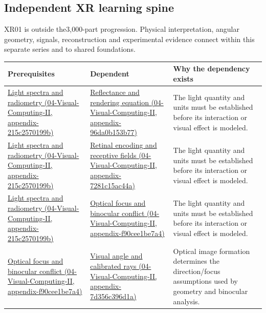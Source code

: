 \subsection{Independent XR learning spine}\label{independent-xr-learning-spine}

XR01 is outside the3,000-part progression. Physical interpretation, angular geometry, signals, reconstruction and experimental evidence connect within this separate series and to shared foundations.

{\def\LTcaptype{none} %
\begin{longtable}[]{@{}
  >{\raggedright\arraybackslash}p{}
  >{\raggedright\arraybackslash}p{}
  >{\raggedright\arraybackslash}p{}@{}}
\toprule\noalign{}
\begin{minipage}[b]{\linewidth}\raggedright
Prerequisites
\end{minipage} & \begin{minipage}[b]{\linewidth}\raggedright
Dependent
\end{minipage} & \begin{minipage}[b]{\linewidth}\raggedright
Why the dependency exists
\end{minipage} \\
\midrule\noalign{}
\endhead
\bottomrule\noalign{}
\endlastfoot
\href{}{Light spectra and radiometry (04-Visual-Computing-II, appendix-215c2570199b)} & \href{}{Reflectance and rendering equation (04-Visual-Computing-II, appendix-96da0b153b77)} & The light quantity and units must be established before its interaction or visual effect is modeled. \\
\href{}{Light spectra and radiometry (04-Visual-Computing-II, appendix-215c2570199b)} & \href{}{Retinal encoding and receptive fields (04-Visual-Computing-II, appendix-7281c15ac44a)} & The light quantity and units must be established before its interaction or visual effect is modeled. \\
\href{}{Light spectra and radiometry (04-Visual-Computing-II, appendix-215c2570199b)} & \href{}{Optical focus and binocular conflict (04-Visual-Computing-II, appendix-f90cee1be7a4)} & The light quantity and units must be established before its interaction or visual effect is modeled. \\
\href{}{Optical focus and binocular conflict (04-Visual-Computing-II, appendix-f90cee1be7a4)} & \href{}{Visual angle and calibrated rays (04-Visual-Computing-II, appendix-7d356c396d1a)} & Optical image formation determines the direction/focus assumptions used by geometry and binocular analysis. \\

\end{longtable}}
